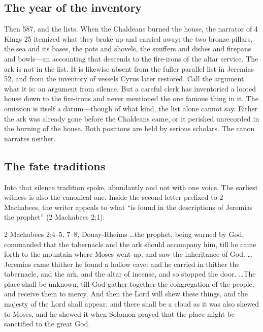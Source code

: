 \subsection{The year of the inventory}

Then 587, and the lists. When the Chaldeans burned the house, the narrator
of 4 Kings 25 itemized what they broke up and carried away:
the two bronze pillars, the sea and its bases, the pots and shovels, the
snuffers and dishes and firepans and bowls---an accounting that descends to
the fire-irons of the altar service. The ark is not in the list. It is
likewise absent from the fuller parallel list in Jeremias 52, and from the
inventory of vessels Cyrus later restored. Call the
argument what it is: an argument from silence. But a careful clerk has
inventoried a looted house down to the fire-irons and never mentioned the
one famous thing in it. The omission is itself a datum---though of what
kind, the list alone cannot say. Either the ark was already gone before the
Chaldeans came, or it perished unrecorded in the burning of the house. Both
positions are held by serious scholars. The canon narrates neither.

\subsection{The fate traditions}

Into that silence tradition spoke, abundantly and not with one voice. The
earliest witness is also the canonical one. Inside the second letter
prefixed to 2 Machabees, the writer appeals to what ``is found in the
descriptions of Jeremias the prophet'' (2 Machabees 2:1):

\begin{witnessbox}{2 Machabees 2:4--5, 7--8, Douay-Rheims}
\ldots the prophet, being warned by God, commanded that the tabernacle and
the ark should accompany him, till he came forth to the mountain where
Moses went up, and saw the inheritance of God. \ldots Jeremias came thither
he found a hollow cave: and he carried in thither the tabernacle, and the
ark, and the altar of incense, and so stopped the door. \ldots The place
shall be unknown, till God gather together the congregation of the people,
and receive them to mercy. And then the Lord will shew these things, and
the majesty of the Lord shall appear, and there shall be a cloud as it was
also shewed to Moses, and he shewed it when Solomon prayed that the place
might be sanctified to the great God.
\end{witnessbox}

